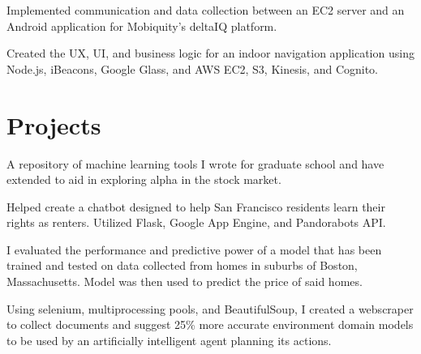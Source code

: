 \documentclass[]{deedy-resume-openfont}
\begin{document}
\begin{minipage}[t]{0.66\textwidth}
\begin{tightemize}
\item Implemented communication and data collection between an EC2 server and an Android application for Mobiquity’s deltaIQ platform.

\item Created the UX, UI, and business logic for an indoor navigation application using Node.js, iBeacons, Google Glass, and AWS EC2, S3, Kinesis, and Cognito.
\end{tightemize}


\section{Projects}

\begin{tightemize}
\item A repository of machine learning tools I wrote for graduate school and have extended to aid in exploring alpha in the stock market.
\end{tightemize}
\sectionsep

\begin{tightemize}
\item Helped create a chatbot designed to help San Francisco residents learn their rights as renters. Utilized Flask, Google App Engine, and Pandorabots API.
\end{tightemize}
\sectionsep

\begin{tightemize}
\item I evaluated the performance and predictive power of a model that has been trained and tested on data collected from homes in suburbs of Boston, Massachusetts. Model was then used to predict the price of said homes.
\end{tightemize}
\sectionsep

\begin{tightemize}
\item Using selenium, multiprocessing pools, and BeautifulSoup, I created a webscraper to collect documents and suggest 25\% more accurate environment domain models to be used by an artificially intelligent agent planning its actions. 
\end{tightemize}
\sectionsep


\end{minipage}
\end{document}
